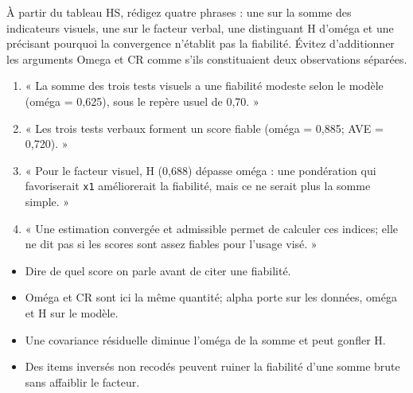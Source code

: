 \documentclass[
  french,
  11pt,
  a4paper,
  DIV=11,
  numbers=noendperiod]{scrreprt}
\providecommand{\tightlist}{%
  \setlength{\itemsep}{0pt}\setlength{\parskip}{0pt}}
\begin{document}
À partir du tableau HS, rédigez quatre phrases : une sur la somme des
indicateurs visuels, une sur le facteur verbal, une distinguant H
d'oméga et une précisant pourquoi la convergence n'établit pas la
fiabilité. Évitez d'additionner les arguments Omega et CR comme s'ils
constituaient deux observations séparées.

\begin{tcolorbox}[enhanced jigsaw, arc=.35mm, bottomrule=.15mm, bottomtitle=1mm, breakable, colback=white, colbacktitle=quarto-callout-tip-color!10!white, colframe=quarto-callout-tip-color-frame, coltitle=black, left=2mm, leftrule=.75mm, opacityback=0, opacitybacktitle=0.6, rightrule=.15mm, title={Réponse}, titlerule=0mm, toprule=.15mm, toptitle=1mm]

\begin{enumerate}
\def\labelenumi{\arabic{enumi}.}
\tightlist
\item
  « La somme des trois tests visuels a une fiabilité modeste selon le
  modèle (oméga = 0,625), sous le repère usuel de 0,70. »
\item
  « Les trois tests verbaux forment un score fiable (oméga = 0,885; AVE
  = 0,720). »
\item
  « Pour le facteur visuel, H (0,688) dépasse oméga : une pondération
  qui favoriserait \texttt{x1} améliorerait la fiabilité, mais ce ne
  serait plus la somme simple. »
\item
  « Une estimation convergée et admissible permet de calculer ces
  indices; elle ne dit pas si les scores sont assez fiables pour l'usage
  visé. »
\end{enumerate}

\end{tcolorbox}

\begin{tcolorbox}[enhanced jigsaw, arc=.35mm, bottomrule=.15mm, bottomtitle=1mm, breakable, colback=white, colbacktitle=quarto-callout-important-color!10!white, colframe=quarto-callout-important-color-frame, coltitle=black, left=2mm, leftrule=.75mm, opacityback=0, opacitybacktitle=0.6, rightrule=.15mm, title={À retenir}, titlerule=0mm, toprule=.15mm, toptitle=1mm]

\begin{itemize}
\tightlist
\item
  Dire de quel score on parle avant de citer une fiabilité.
\item
  Oméga et CR sont ici la même quantité; alpha porte sur les données,
  oméga et H sur le modèle.
\item
  Une covariance résiduelle diminue l'oméga de la somme et peut gonfler
  H.
\item
  Des items inversés non recodés peuvent ruiner la fiabilité d'une somme
  brute sans affaiblir le facteur.
\end{itemize}

\end{tcolorbox}
\end{document}
